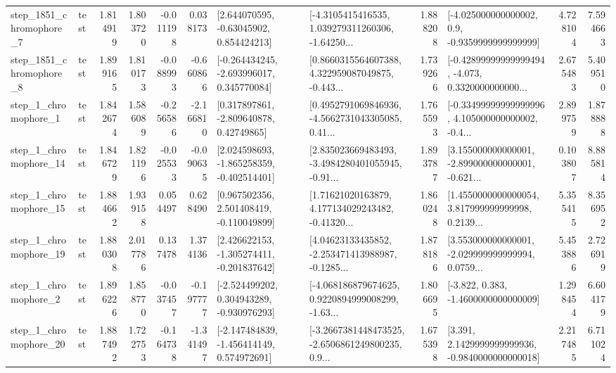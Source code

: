 \begin{tabular}{llrrrrllrlrr}
  step\_1851\_chromophore\_7 &      test &      1.814919 &    1.803720 &     -0.011198 &  0.038173 &     [2.644070595, -0.63045902, 0.854424213] &  [-4.3105415416535, 1.039279311260306, -1.64250... &       1.888208 &     [-4.025000000000002, 0.9, -0.9359999999999999] &            4.728104 &          7.594663 \\
  step\_1851\_chromophore\_8 &      test &      1.899165 &    1.810173 &     -0.088993 & -0.660866 &   [-0.264434245, -2.693996017, 0.345770084] &  [0.8660315564607388, 4.322959087049875, -0.443... &       1.739266 &  [-0.42899999999999494, -4.073, 0.3320000000000... &            2.675483 &          5.409510 \\
     step\_1\_chromophore\_1 &      test &      1.842674 &    1.586089 &     -0.256586 & -2.166810 &     [0.317897861, -2.809640878, 0.42749865] &  [0.4952791069846936, -4.5662731043305085, 0.41... &       1.765593 &  [-0.33499999999999996, 4.105000000000002, -0.4... &            2.899759 &          1.878888 \\
    step\_1\_chromophore\_14 &      test &      1.846729 &    1.821196 &     -0.025533 & -0.090635 &   [2.024598693, -1.865258359, -0.402514401] &  [2.835023669483493, -3.4984280401055945, -0.91... &       1.893787 &  [3.155000000000001, -2.899000000000001, -0.621... &            0.103807 &          8.885814 \\
    step\_1\_chromophore\_15 &      test &      1.884662 &    1.939158 &      0.054497 &  0.628490 &    [0.967502356, 2.501408419, -0.110049899] &  [1.71621020163879, 4.177134029243482, -0.41320... &       1.860248 &  [1.4550000000000054, 3.817999999999998, 0.2139... &            5.355415 &          8.356952 \\
    step\_1\_chromophore\_19 &      test &      1.880308 &    2.017786 &      0.137478 &  1.374136 &   [2.426622153, -1.305274411, -0.201837642] &  [4.04623133435852, -2.253471413988987, -0.1285... &       1.878186 &  [3.553000000000001, -2.029999999999994, 0.0759... &            5.453886 &          2.726919 \\
     step\_1\_chromophore\_2 &      test &      1.896226 &    1.858770 &     -0.037457 & -0.197777 &   [-2.524499202, 0.304943289, -0.930976293] &  [-4.068186879674625, 0.9220894999008299, -1.63... &       1.806695 &               [-3.822, 0.383, -1.4600000000000009] &            1.298454 &          6.604179 \\
    step\_1\_chromophore\_20 &      test &      1.887492 &    1.722753 &     -0.164738 & -1.341497 &   [-2.147484839, -1.456414149, 0.574972691] &  [-3.2667381448473525, -2.6506861249800235, 0.9... &       1.675398 &   [3.391, 2.1429999999999936, -0.9840000000000018] &            2.217485 &          6.711024 \\

\end{tabular}
